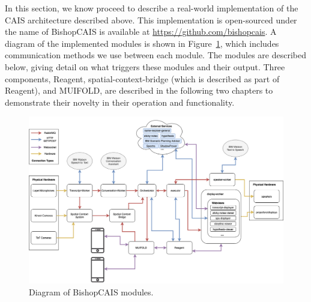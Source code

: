 
In this section, we know proceed to describe a real-world implementation of the
CAIS architecture described above. This implementation is open-sourced under the
name of BishopCAIS is available at \url{https://github.com/bishopcais}. A diagram
of the implemented modules is shown in Figure~\ref{fig:cais_implementation}, which includes
communication methods we use between each module. The modules are described below, giving detail on what
triggers these modules and their output. Three components, Reagent, 
spatial-context-bridge (which is described as part of Reagent), and MUIFOLD, are
described in the following two chapters to demonstrate their novelty in their
operation and functionality.


\begin{figure}
    \centering
    \includegraphics[width=1\columnwidth]{chapters/02_technology/figures/cais_implementation_full.png}
    \caption{Diagram of BishopCAIS modules.}
    \label{fig:cais_implementation}
\end{figure}
